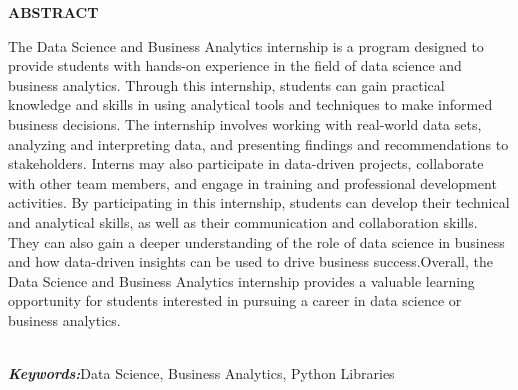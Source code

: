 \thispagestyle{plain}
\begin{center}
    \Large \textbf{\uppercase{Abstract}}
\end{center}

\vspace{3\baselineskip}

\justify
\noindent
The Data Science and Business Analytics internship is a program designed to provide students with hands-on experience in the field of data science and business analytics. Through this internship, students can gain practical knowledge and skills in using analytical tools and techniques to make informed business decisions.
The internship involves working with real-world data sets, analyzing and interpreting data, and presenting findings and recommendations to stakeholders. Interns may also participate in data-driven projects, collaborate with other team members, and engage in training and professional development activities.
By participating in this internship, students can develop their technical and analytical skills, as well as their communication and collaboration skills. They can also gain a deeper understanding of the role of data science in business and how data-driven insights can be used to drive business success.Overall, the Data Science and Business Analytics internship provides a valuable learning opportunity for students interested in pursuing a career in data science or business analytics.







\\

\textbf{\emph{Keywords:}}Data Science, Business Analytics,
Python Libraries\\